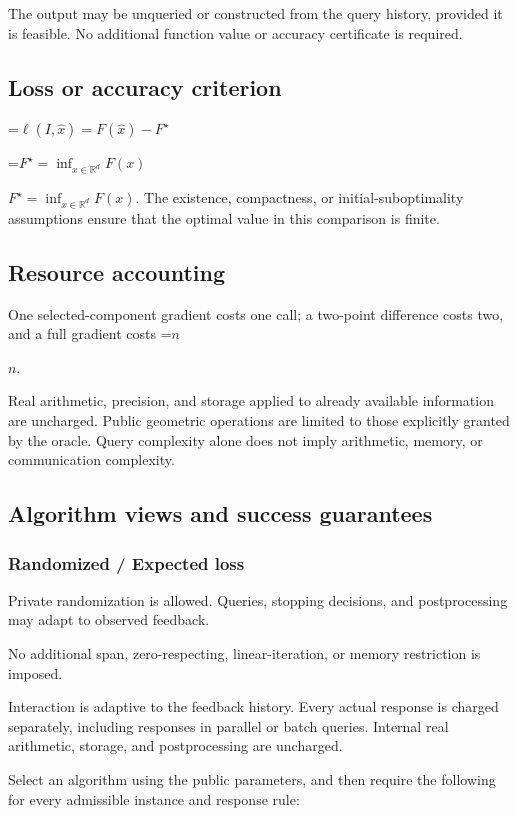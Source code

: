 \documentclass[10pt,a4paper]{article}
\newcommand{\AtlasMath}[1]{\par\begingroup\centering\setbox0=\hbox{$\displaystyle #1$}\ifdim\wd0>1.4\linewidth\typeout{ATLAS WIDE FORMULA: \the\wd0}\fi\ifdim\wd0>\linewidth\resizebox{\linewidth}{!}{\box0}\else\box0\fi\par\endgroup}
\newcommand{\AtlasInlineMath}[1]{\begingroup\setbox0=\hbox{$#1$}\ifdim\wd0>.4\linewidth\endgroup\AtlasMath{#1}\else\endgroup$#1$\fi}
\begin{document}
The output may be unqueried or constructed from the query history, provided it is feasible. No additional function value or accuracy certificate is required.

\subsection{Loss or accuracy criterion}

\AtlasMath{\ell(I,\widehat{x})=F(\widehat{x})-F^\star}


\AtlasInlineMath{F^\star=\inf_{x\in \mathbb{R}^d}F(x)}. The existence, compactness, or initial-suboptimality assumptions ensure that the optimal value in this comparison is finite.

\subsection{Resource accounting}
One selected-component gradient costs one call; a two-point difference costs two, and a full gradient costs \AtlasInlineMath{n}.

Real arithmetic, precision, and storage applied to already available information are uncharged. Public geometric operations are limited to those explicitly granted by the oracle. Query complexity alone does not imply arithmetic, memory, or communication complexity.

\subsection{Algorithm views and success guarantees}
\subsubsection{Randomized / Expected loss}
Private randomization is allowed. Queries, stopping decisions, and postprocessing may adapt to observed feedback.

No additional span, zero-respecting, linear-iteration, or memory restriction is imposed.

Interaction is adaptive to the feedback history. Every actual response is charged separately, including responses in parallel or batch queries. Internal real arithmetic, storage, and postprocessing are uncharged.

Select an algorithm using the public parameters, and then require the following for every admissible instance and response rule:
\end{document}
